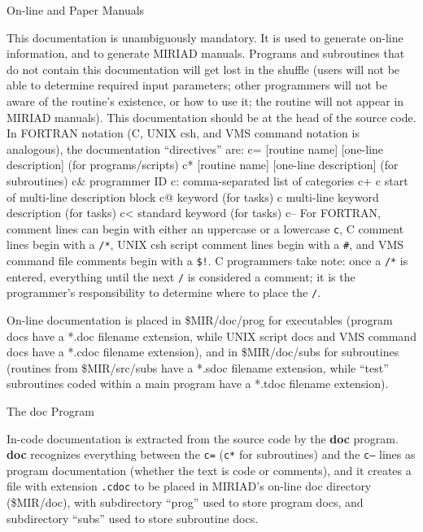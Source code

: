 
\beginsection On-line and Paper Manuals

This documentation is unambiguously mandatory.  It is used to generate
on-line information, and to generate MIRIAD manuals. Programs and
subroutines that do not contain this documentation will get lost in the
shuffle (users will not be able to determine required input parameters;
other programmers will not be aware of the routine's existence, or how
to use it; the routine will not appear in MIRIAD manuals).  This
documentation should be at the head of the source code.  In FORTRAN
notation (C, UNIX csh, and VMS command notation is analogous), the
documentation ``directives'' are:
{\ninepoint\begintt
c=  [routine name] [one-line description]   (for programs/scripts)
c*  [routine name] [one-line description]   (for subroutines)
c&  programmer ID
c:  comma-separated list of categories
c+
c   start of multi-line description block
c@  keyword                                       (for tasks)
c   multi-line keyword description                (for tasks)
c<  standard keyword                              (for tasks)
c-- 
\endtt}
For FORTRAN, comment lines can begin with either an uppercase or a 
lowercase {\tt c}, C comment lines begin with a {\tt /*}, UNIX csh
script comment lines begin with a {\tt \#}, and VMS command file
comments begin with a {\tt \$!}.  C programmers take note:  once a
{\tt /*} is entered, everything until the next {\tt */} is considered
a comment; it is the programmer's responsibility to determine where to
place the {\tt */}.

On-line documentation is placed in \$MIR/doc/prog for executables
(program docs have a *.doc filename extension, while UNIX script docs
and VMS command docs have a *.cdoc filename extension), and in
\$MIR/doc/subs for subroutines (routines from \$MIR/src/subs have a
*.sdoc filename extension, while ``test'' subroutines coded within a
main program have a *.tdoc filename extension).

\beginsection The doc Program

In-code documentation is extracted from the source code by the {\bf doc}
program.  {\bf doc} recognizes everything between the {\tt c=} ({\tt c*}
for subroutines) and the {\tt c--} lines as program documentation (whether
the text is code or comments), and it creates a file with extension
{\tt .cdoc} to be placed in MIRIAD's on-line doc directory
(\$MIR/doc), with subdirectory ``prog'' used to store program docs, and
subdirectory ``subs'' used to store subroutine docs.

